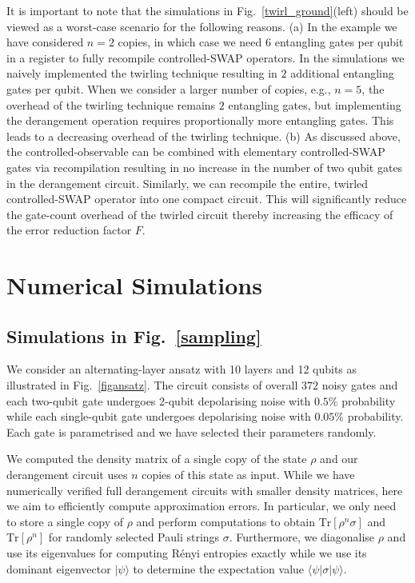 \documentclass[aps,prx,showpacs,twocolumn,reprint]{revtex4-2}
\newcommand{\tr}{\mathrm{Tr}}
\begin{document}
{It is important to note that the simulations in Fig.~\ref{twirl_ground}(left) should be viewed as a worst-case scenario
for the following reasons.
(a) In the example we have considered $n=2$ copies, in which case we need $6$ entangling gates per qubit in a register
to fully recompile controlled-SWAP operators.
In the simulations we naively implemented the twirling technique resulting in $2$ additional entangling gates per qubit.
When we consider a larger number of copies, e.g., $n=5$, the overhead of the twirling technique remains $2$ 
entangling gates, but implementing the derangement operation requires proportionally more entangling gates. This leads to
a decreasing overhead of the twirling technique.
(b) As discussed above, the controlled-observable can be combined with elementary controlled-SWAP gates via recompilation resulting
in no increase in the number of two qubit gates in the derangement circuit. Similarly, we can recompile the entire, twirled
controlled-SWAP operator into one compact circuit. This will significantly reduce the gate-count overhead of the twirled circuit
thereby increasing the efficacy of the error reduction factor $F$.












\section{Numerical Simulations \label{numerics}}






\subsection{Simulations in Fig.~\ref{sampling}}

We consider an alternating-layer ansatz with 10 layers and 12 qubits as illustrated in Fig.~\ref{figansatz}.
The circuit consists of overall $372$ noisy gates and 
each two-qubit gate undergoes 2-qubit depolarising noise with $0.5\%$ probability while each single-qubit gate undergoes
depolarising noise with $0.05\%$ probability.
Each gate is parametrised and we have selected their parameters randomly.

We computed the density matrix of a single copy of the state $\rho$ and our derangement
circuit uses $n$ copies of this state as input. While we have numerically verified full derangement circuits
with smaller density matrices, here we aim to efficiently compute approximation errors. In particular,
we only need to store a single copy of $\rho$ and perform computations to obtain
$\tr[\rho^n \sigma]$ and $\tr[\rho^n]$ for randomly selected Pauli strings $\sigma$.
Furthermore, we diagonalise $\rho$ and use its eigenvalues for computing
R{\'e}nyi entropies exactly while we use its dominant eigenvector $| \psi \rangle$ to
determine the  expectation value $\langle \psi | \sigma | \psi \rangle$.

}
\end{document}
